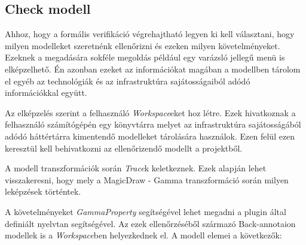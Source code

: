 

\subsection{Check modell}

Ahhoz, hogy a formális verifikáció végrehajtható legyen ki kell választani, hogy milyen modelleket szeretnénk ellenőrizni és ezeken milyen követelményeket. Ezeknek a megadására sokféle megoldás például egy varázsló jellegű menü is elképzelhető. Én azonban ezeket az információkat magában a modellben tárolom el egyéb az technológiák és az infrastruktúra sajátosságaiból adódó információkkal együtt.

Az elképzelés szerint a felhasználó \emph{Workspace}eket hoz létre. Ezek hivatkoznak a felhasználó számítógépén egy könyvtárra melyet az infrastruktúra sajátosságából adódó háttértárra kimentendő modelleket tárolására használok. Ezen felül ezen keresztül kell behivatkozni az ellenőrizendő modellt a projektből.

A modell transzformációk során \emph{Trace}k keletkeznek. Ezek alapján lehet visszakeresni, hogy mely a MagicDraw - Gamma transzformáció során milyen leképzések történtek.

A követelményeket \emph{GammaProperty} segítségével lehet megadni a plugin által definiált nyelvtan segítségével. Az ezek ellenőrzéséből származó Back-annotaion modellek is a \emph{Workspace}ben helyezkednek el. A modell elemei a következők:

